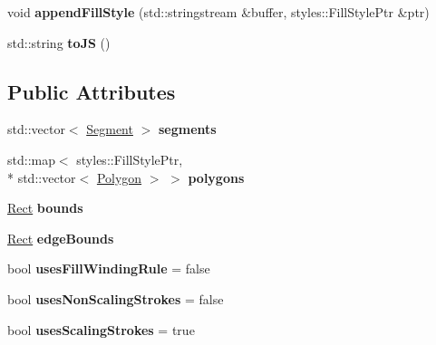 \begin{DoxyCompactItemize}
\item 
\hypertarget{classjswf_1_1flash_1_1_shape_aae96ad6c56d45bb04ba1cbf7e816aa60}{void {\bfseries append\+Fill\+Style} (std\+::stringstream \&buffer, styles\+::\+Fill\+Style\+Ptr \&ptr)}\label{classjswf_1_1flash_1_1_shape_aae96ad6c56d45bb04ba1cbf7e816aa60}

\item 
\hypertarget{classjswf_1_1flash_1_1_shape_a5a5b9990c0af882c30b067351cfe3522}{std\+::string {\bfseries to\+J\+S} ()}\label{classjswf_1_1flash_1_1_shape_a5a5b9990c0af882c30b067351cfe3522}

\end{DoxyCompactItemize}
\subsection*{Public Attributes}
\begin{DoxyCompactItemize}
\item 
\hypertarget{classjswf_1_1flash_1_1_shape_a73bf4f95729d5bbc181b78480d937705}{std\+::vector$<$ \hyperlink{structjswf_1_1flash_1_1_segment}{Segment} $>$ {\bfseries segments}}\label{classjswf_1_1flash_1_1_shape_a73bf4f95729d5bbc181b78480d937705}

\item 
\hypertarget{classjswf_1_1flash_1_1_shape_a774946e2825396e21bbcb164a73dd2ae}{std\+::map$<$ styles\+::\+Fill\+Style\+Ptr, \\*
std\+::vector$<$ \hyperlink{structjswf_1_1flash_1_1_polygon}{Polygon} $>$ $>$ {\bfseries polygons}}\label{classjswf_1_1flash_1_1_shape_a774946e2825396e21bbcb164a73dd2ae}

\item 
\hypertarget{classjswf_1_1flash_1_1_shape_a01c43354d2cf7eb1aec31db26e674250}{\hyperlink{structjswf_1_1flash_1_1_rect}{Rect} {\bfseries bounds}}\label{classjswf_1_1flash_1_1_shape_a01c43354d2cf7eb1aec31db26e674250}

\item 
\hypertarget{classjswf_1_1flash_1_1_shape_aa2fe0ddeccd74dea4a9315e0f33ca5cb}{\hyperlink{structjswf_1_1flash_1_1_rect}{Rect} {\bfseries edge\+Bounds}}\label{classjswf_1_1flash_1_1_shape_aa2fe0ddeccd74dea4a9315e0f33ca5cb}

\item 
\hypertarget{classjswf_1_1flash_1_1_shape_a6e26ce8202341567c3cfde08ee5bb5d8}{bool {\bfseries uses\+Fill\+Winding\+Rule} = false}\label{classjswf_1_1flash_1_1_shape_a6e26ce8202341567c3cfde08ee5bb5d8}

\item 
\hypertarget{classjswf_1_1flash_1_1_shape_abbd817e2be79fedf3e9578f209ead1df}{bool {\bfseries uses\+Non\+Scaling\+Strokes} = false}\label{classjswf_1_1flash_1_1_shape_abbd817e2be79fedf3e9578f209ead1df}

\item 
\hypertarget{classjswf_1_1flash_1_1_shape_a27bc248ec40d1b874b43538b272824a4}{bool {\bfseries uses\+Scaling\+Strokes} = true}\label{classjswf_1_1flash_1_1_shape_a27bc248ec40d1b874b43538b272824a4}

\end{DoxyCompactItemize}


